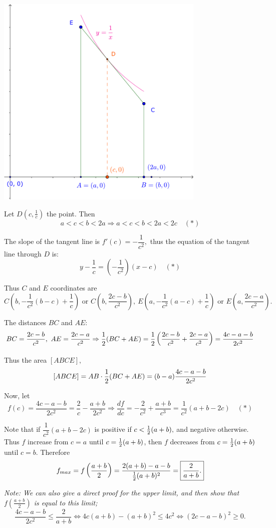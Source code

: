 \documentclass{article}
\begin{document}
\begin{center}
    \includegraphics[width=10cm]{./svg/pdf/derivative-2-5.pdf}
\end{center}

\begin{soln}
    Let $D \left(c, \frac{1}{c} \right)$ the point. Then 
    \[
        a < c < b < 2a \Rightarrow a < c < b < 2a < 2c \quad (*)
    \]
    
    The slope of the tangent line is $f'(c) = -\dfrac{1}{c^2},$ thus the equation of the tangent line through $D$ is:
    \[
        y -  \frac{1}{c} = \left( -\frac{1}{c^2} \right) (x-c) \quad (*)
    \]

    Thus $C$ and $E$ coordinates are
    \[
        C \left( b, -\frac{1}{c^2}(b-c) + \frac{1}{c} \right) \text{\ or\ } C\left( b, \frac{2c - b}{c^2} \right),\ 
        E \left( a, -\frac{1}{c^2}(a-c) + \frac{1}{c} \right) \text{\ or\ } E\left( a, \frac{2c - a}{c^2} \right).
    \]

    The distances $BC$ and $AE$:
    \[
        BC = \frac{2c - b}{c^2},\ AE = \frac{2c - a}{c^2}
        \Rightarrow \frac{1}{2}(BC + AE) = \frac{1}{2} \left( \frac{2c - b}{c^2} + \frac{2c - a}{c^2} \right) = \frac{4c - a - b}{2c^2}
    \]

    Thus the area $[ABCE],$
    \[
        [ABCE] = AB \cdot \frac{1}{2}(BC + AE) = (b-a)\frac{4c - a - b}{2c^2}
    \]

    Now, let 
    \[
        f(c) = \frac{4c - a - b}{2c^2} = \frac{2}{c} - \frac{a+b}{2c^2} 
        \Rightarrow \frac{df}{dc} = -\frac{2}{c^2} + \frac{a+b}{c^3} = \frac{1}{c^2}(a+b-2c) \quad(*)
    \]

    Note that if $\dfrac{1}{c^2}(a+b-2c)$ is positive if $c < \frac{1}{2}(a+b),$ and negative otherwise.
    Thus $f$ increase from $c = a$ until $c= \frac{1}{2}(a+b)$, then $f$ decreases from $c= \frac{1}{2}(a+b)$ until $c=b.$
    Therefore 
    \[
        f_{max} = f\left(\frac{a+b}{2}\right) = \frac{2(a+b) - a - b}{\frac{1}{2}(a+b)^2} = \boxed{\frac{2}{a+b}.}
    \]

    \textit{Note: We can also give a direct proof for the upper limit, and then show that $f\left(\frac{a+b}{2}\right)$ is equal to this limit;}
    \[
        \frac{4c - a - b}{2c^2}  \le \frac{2}{a+b} \Leftrightarrow 4c(a+b) - (a+b)^2 \le 4c^2 \Leftrightarrow (2c -a -b)^2 \ge 0.
    \]
\end{soln}
\end{document}
